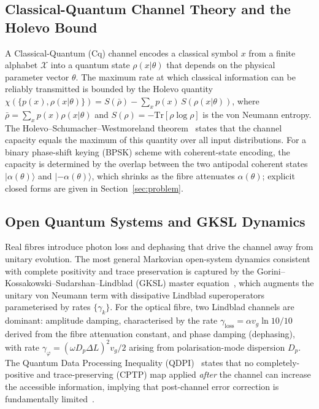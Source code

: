 \documentclass[journal,twocolumn]{IEEEtran}
\theoremstyle{definition}
\theoremstyle{plain}
\newcommand{\Tr}{\mathrm{Tr}}
\begin{document}
\subsection{Classical-Quantum Channel Theory and the Holevo Bound}

A Classical-Quantum (Cq) channel encodes a classical symbol $x$
from a finite alphabet $\mathcal{X}$ into a quantum state
$\rho(x|\theta)$ that depends on the physical parameter vector
$\theta$.  The maximum rate at which classical information can be
reliably transmitted is bounded by the Holevo quantity
$\chi(\{p(x),\rho(x|\theta)\}) = S(\bar\rho) - \sum_x p(x)\,
S(\rho(x|\theta))$, where $\bar\rho = \sum_x p(x)\rho(x|\theta)$
and $S(\rho) = -\Tr[\rho\log\rho]$ is the von Neumann entropy.  The
Holevo--Schumacher--Westmoreland theorem~\cite{holevo1973,schumacher1997}
states that the channel capacity equals the maximum of this quantity
over all input distributions.  For a binary phase-shift keying
(BPSK) scheme with coherent-state encoding, the capacity is
determined by the overlap between the two antipodal coherent states
$|\alpha(\theta)\rangle$ and $|-\alpha(\theta)\rangle$, which
shrinks as the fibre attenuates $\alpha(\theta)$; explicit closed
forms are given in Section~\ref{sec:problem}.

\subsection{Open Quantum Systems and GKSL Dynamics}

Real fibres introduce photon loss and dephasing that drive the
channel away from unitary evolution.  The most general
Markovian open-system dynamics consistent with complete positivity
and trace preservation is captured by the
Gorini--Kossakowski--Sudarshan--Lindblad (GKSL) master
equation~\cite{gorini1976,lindblad1976}, which augments the
unitary von Neumann term with dissipative Lindblad superoperators
parameterised by rates $\{\gamma_k\}$.  For the optical fibre, two
Lindblad channels are dominant: amplitude damping, characterised
by the rate $\gamma_{\mathrm{loss}} = \alpha v_g \ln 10 / 10$
derived from the fibre attenuation constant, and phase damping
(dephasing), with rate $\gamma_\varphi = (\omega D_p \Delta L)^2
v_g / 2$ arising from polarisation-mode dispersion $D_p$.  The
Quantum Data Processing Inequality (QDPI)~\cite{nielsen2000} states
that no completely-positive and trace-preserving (CPTP) map applied
\emph{after} the channel can increase the accessible information,
implying that post-channel error correction is fundamentally
limited~\cite{giovannetti2014}.
\end{document}

